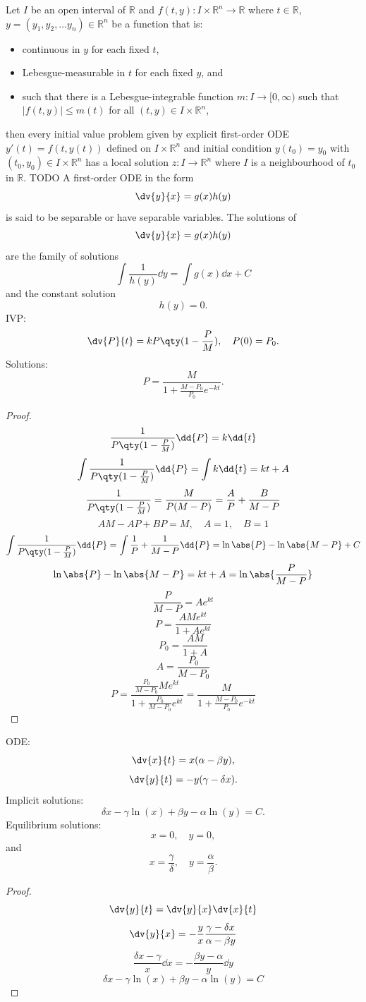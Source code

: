\documentclass[a4paper,12pt]{report}
\begin{document}
Let $I$ be an open interval of $\mathbb{R}$ and $f(t,y)\colon I\times\mathbb{R}^n\to\mathbb{R}$ where $t\in\mathbb{R}$, $y=(y_1, y_2,\dots  y_n)\in\mathbb{R}^n$ be a function that is:
\begin{itemize}
\item continuous in $y$ for each fixed $t$,
\item Lebesgue-measurable in $t$ for each fixed $y$, and
\item such that there is a Lebesgue-integrable function $m\colon I\to [0,\infty )$ such that $|f(t,y)|\leq m(t)$ for all $(t,y)\in I\times\mathbb{R}^n$,
\end{itemize}
then every initial value problem given by explicit first-order ODE $y'(t)=f\left(t,y(t)\right)$ defined on $I\times\mathbb{R}^n$ and initial condition $y\left(t_{0}\right)=y_{0}$ with $(t_{0},y_{0})\in I\times\mathbb{R}^n$ has a local solution $z\colon I\to \mathbb {R}^n$ where $I$ is a neighbourhood of $t_0$ in $\mathbb{R}$.
TODO
A first-order ODE in the form
\[\dv{y}{x}=g(x)h(y)\]
is said to be separable or have separable variables.
The solutions of
\[\dv{y}{x}=g(x)h(y)\]
are the family of solutions
\[\int\frac{1}{h(y)}\dd{y}=\int g(x)\dd{x}+C\]
and the constant solution
\[h(y)=0.\]
IVP:
\[\dv{P}{t}=kP\qty(1-\frac{P}{M}),\quad P(0)=P_0.\]
Solutions:
\[P=\frac{M}{1+\frac{M-P_0}{P_0}e^{-kt}}.\]
\begin{proof}
\[\frac{1}{P\qty(1-\frac{P}{M})}\dd{P}=k\dd{t}\]
\[\int\frac{1}{P\qty(1-\frac{P}{M})}\dd{P}=\int k\dd{t}=kt+A\]
\[\frac{1}{P\qty(1-\frac{P}{M})}=\frac{M}{P(M-P)}=\frac{A}{P}+\frac{B}{M-P}\]
\[AM-AP+BP=M,\quad A=1,\quad B=1\]
\[\int\frac{1}{P\qty(1-\frac{P}{M})}\dd{P}=\int\frac{1}{P}+\frac{1}{M-P}\dd{P}=\ln\abs{P}-\ln\abs{M-P}+C\]
\[\ln\abs{P}-\ln\abs{M-P}=kt+A=\ln\abs{\frac{P}{M-P}}\]
\[\frac{P}{M-P}=Ae^{kt}\]
\[P=\frac{AMe^{kt}}{1+Ae^{kt}}\]
\[P_0=\frac{AM}{1+A}\]
\[A=\frac{P_0}{M-P_0}\]
\[P=\frac{\frac{P_0}{M-P_0}Me^{kt}}{1+\frac{P_0}{M-P_0}e^{kt}}=\frac{M}{1+\frac{M-P_0}{P_0}e^{-kt}}\]
\end{proof}
ODE:
\[\dv{x}{t}=x(\alpha-\beta y),\]
\[\dv{y}{t}=-y(\gamma-\delta x).\]
Implicit solutions:
\[\delta x-\gamma\ln(x)+\beta y-\alpha\ln(y)=C.\]
Equilibrium solutions:
\[x=0,\quad y=0,\]
and
\[x=\frac{\gamma}{\delta},\quad y=\frac{\alpha}{\beta}.\]
\begin{proof}
\[\dv{y}{t}=\dv{y}{x}\dv{x}{t}\]
\[\dv{y}{x}=-\frac{y}{x}\frac{\gamma-\delta x}{\alpha-\beta y}\]
\[\frac{\delta x-\gamma}{x}\dd{x}=-\frac{\beta y-\alpha}{y}\dd{y}\]
\[\delta x-\gamma\ln(x)+\beta y-\alpha\ln(y)=C\]
\end{proof}
\end{document}
